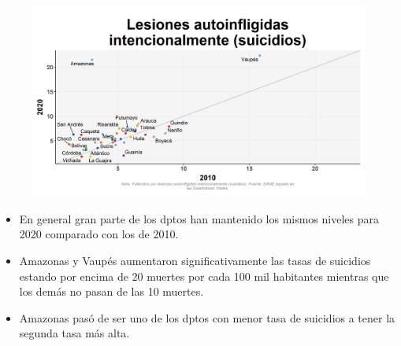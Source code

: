     \begin{figure}[H]
        \caption[Lesiones autoinfligidas intencionalmente (suicidios) por departamentos - 2010 VS 2020 ]{\label{suicid_dpto_scatter} }
        \begin{center}
        \includegraphics[width=\textwidth,keepaspectratio]{img/var_294_scatter_time.png}
        \end{center}
    \end{figure}
            \begin{itemize}
                \item En general gran parte de los dptos han mantenido los mismos niveles para 2020 comparado con los de 2010.
                \item Amazonas y Vaupés aumentaron significativamente las tasas de suicidios estando por encima de 20 muertes por cada 100 mil habitantes mientras que los demás no pasan de las 10 muertes.
                \item Amazonas pasó de ser uno de los dptos con menor tasa de suicidios a tener la segunda tasa más alta.
                \end{itemize}

